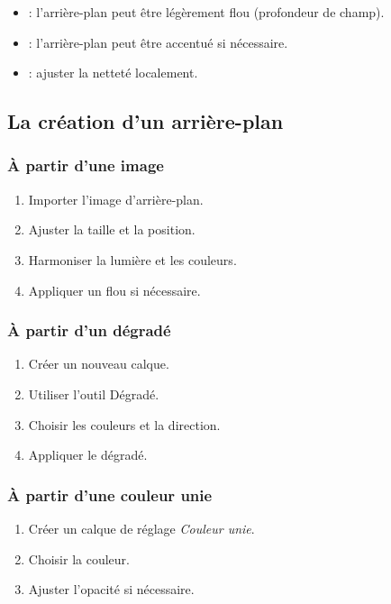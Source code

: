 \begin{itemize}
    \item {} : l'arrière-plan peut être légèrement flou (profondeur de champ).
    \item {} : l'arrière-plan peut être accentué si nécessaire.
    \item {} : ajuster la netteté localement.
\end{itemize}

\subsection{La création d'un arrière-plan}

\subsubsection{À partir d'une image}

\begin{enumerate}
    \item Importer l'image d'arrière-plan.
    \item Ajuster la taille et la position.
    \item Harmoniser la lumière et les couleurs.
    \item Appliquer un flou si nécessaire.
\end{enumerate}

\subsubsection{À partir d'un dégradé}

\begin{enumerate}
    \item Créer un nouveau calque.
    \item Utiliser l'outil Dégradé.
    \item Choisir les couleurs et la direction.
    \item Appliquer le dégradé.
\end{enumerate}

\subsubsection{À partir d'une couleur unie}

\begin{enumerate}
    \item Créer un calque de réglage \emph{Couleur unie}.
    \item Choisir la couleur.
    \item Ajuster l'opacité si nécessaire.
\end{enumerate}

